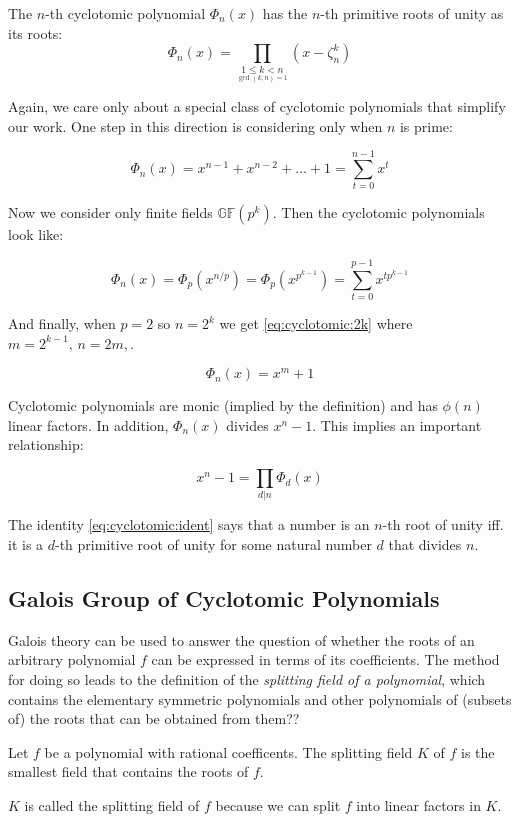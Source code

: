 \begin{definition}
    The $n$-th cyclotomic polynomial $\Phi_n(x)$ has the $n$-th primitive roots of unity as its roots: 
    \begin{equation}
        \Phi_n(x) = \prod_{\underset{\gcd(k,n)=1}{1 \leq k < n}} (x - \zeta_n^k)
    \end{equation}
\end{definition}

Again, we care only about a special class of cyclotomic polynomials that simplify our work. One step in this direction is considering only when $n$ is prime:

\begin{equation}
    \label{eq:cyclotomic:p}
    \Phi_n(x) = x^{n-1} + x^{n-2} + \dots + 1 = \sum_{t=0}^{n-1}x^t
\end{equation}

Now we consider only finite fields $\mathbb{GF}(p^k)$. Then the cyclotomic polynomials look like:

\begin{equation}
    \label{eq:cyclotomic:pk}
    \Phi_n(x) = \Phi_p(x^{n/p}) = \Phi_p(x^{p^{k-1}}) = \sum_{t=0}^{p-1}x^{tp^{k-1}}
\end{equation}

And finally, when $p=2$ so $n=2^k$ we get \eqref{eq:cyclotomic:2k} where $m=2^{k-1},\,n=2m,$.

\begin{equation}
    \label{eq:cyclotomic:2k}   
    \Phi_n(x) = x^m+1
\end{equation}

Cyclotomic polynomials are monic (implied by the definition) and has $\phi(n)$ linear factors. In addition, $\Phi_n(x)$ divides $x^n-1$. This implies an important relationship:

\begin{equation}
    \label{eq:cyclotomic:ident}
    x^n-1 = \prod_{d|n} \Phi_d(x)    
\end{equation}

The identity \eqref{eq:cyclotomic:ident} says that a number is an $n$-th root of unity iff. it is a $d$-th primitive root of unity for some natural number $d$ that divides $n$.



\subsection{Galois Group of Cyclotomic Polynomials}
Galois theory can be used to answer the question of whether the roots of an arbitrary polynomial $f$ can be expressed in terms of its coefficients. The method for doing so leads to the definition of the \emph{splitting field of a polynomial}, which contains the elementary symmetric polynomials and other polynomials of (subsets of) the roots that can be obtained from them??

\begin{definition}
    Let $f$ be a polynomial with rational coefficents. The splitting field $K$ of $f$ is the smallest field that contains the roots of $f$.
\end{definition}

$K$ is called the splitting field of $f$ because we can split $f$ into linear factors in $K$.

